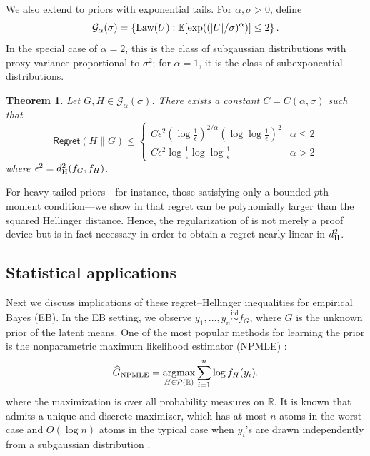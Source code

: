 \documentclass[letterpaper,11pt]{article}
\def\argmax{\mathop{\rm argmax}}
\def\exp{\mathop{\rm exp}}
\newcommand{\reals}{\mathbb{R}}
\newcommand{\Expect}{\mathbb{E}}
\newcommand{\iid}{iid\xspace}
\newcommand{\hellinger}{d_{\rm H}}
\newcommand{\pth}[1]{\left( #1 \right)}
\newcommand{\iiddistr}{\stackrel{\text{\iid}}{\sim}}
\newcommand{\calG}{{\mathcal{G}}}
\newcommand{\calP}{{\mathcal{P}}}
\newtheorem{theorem}{Theorem}
\theoremstyle{definition}
\newcommand{\GNPMLE}{\hat G_{\rm NPMLE}}
\newcommand{\Regret}{\mathsf{Regret}}
\renewcommand{\hat}{\widehat}
\newcommand{\Law}{\text{Law}}
\begin{document}
We also extend  to priors with exponential tails.
 For $\alpha, \sigma>0$, define
 \begin{equation}
 \label{eq:Galpha}
     \calG_{\alpha}(\sigma) = \left\{\Law(U):
     \Expect\!\left[\exp\!\left((|U|/\sigma)^\alpha\right)\right] \leq 2\right\}.
 \end{equation}
 In the special case of $\alpha=2$, this is the class of subgaussian distributions with
 proxy variance  proportional to $\sigma^2$; for $\alpha = 1$, it is the
 class of subexponential distributions.

 \begin{theorem}
 \label{thm:ub-exp}
 Let $G,H\in \calG_\alpha(\sigma)$.
 There exists a constant $C=C(\alpha,\sigma)$ such that
     \[
        \Regret(H\|G)
        \leq
        \begin{cases}
C   \epsilon^2 \pth{\log \frac{1}{\epsilon}}^{2/\alpha}
        \pth{\log\log \frac{1}{\epsilon}}^2            & \alpha\leq 2 \\
         C   \epsilon^2 \log \frac{1}{\epsilon}
        \log\log \frac{1}{\epsilon}
            & \alpha>2
        \end{cases}
      \]
      where $\epsilon^2 = \hellinger^2(f_{G},f_{H})$.
 \end{theorem}

For heavy-tailed priors---for instance, those satisfying only a bounded $p$th-moment
condition---we show in  that regret can be polynomially larger than
the squared Hellinger distance. Hence, the regularization of \cite{JiangZhang2009} is not
merely a proof device but is in fact necessary in order to obtain a regret nearly linear
in $\hellinger^2$.

\subsection{Statistical applications}
\label{sec:statsapp}
Next we discuss implications of these
regret--Hellinger inequalities for empirical Bayes (EB).
In the EB setting, we observe $y_1,\ldots,y_n \iiddistr f_G$, where $G$ is the unknown prior of the latent means.
One of the most popular methods for learning the prior is the nonparametric maximum
likelihood estimator (NPMLE) \cite{KW56}:
\begin{equation}
\GNPMLE
= \argmax_{H \in \calP(\reals)} \sum_{i=1}^n \log f_H(y_i).
    \label{eq:NPMLE}
\end{equation}
where the maximization is over all probability measures on $\reals$.
It is known that  admits a unique and discrete maximizer, which has at most $n$ atoms in the worst case  and $O(\log n)$ atoms in the typical case when $y_i$'s are drawn independently from a subgaussian distribution \cite{simar1976maximum,lindsay1983geometry1,PW20-npmle}.
\end{document}
